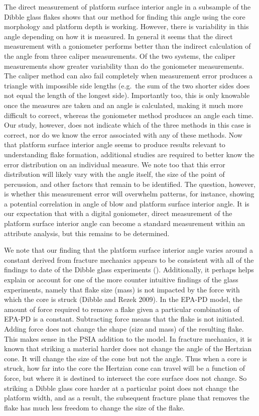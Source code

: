 \documentclass[10pt,letterpaper]{article}
\begin{document}
The direct measurement of platform surface interior angle in a subsample
of the Dibble glass flakes shows that our method for finding this angle
using the core morphology and platform depth is working. However, there
is variability in this angle depending on how it is measured. In general
it seems that the direct measurement with a goniometer performs better
than the indirect calculation of the angle from three caliper
measurements. Of the two systems, the caliper measurements show greater
variability than do the goniometer measurements. The caliper method can
also fail completely when measurement error produces a triangle with
impossible side lengths (e.g.~the sum of the two shorter sides does not
equal the length of the longest side). Importantly too, this is only
knowable once the measures are taken and an angle is calculated, making
it much more difficult to correct, whereas the goniometer method
produces an angle each time. Our study, however, does not indicate which
of the three methods in this case is correct, nor do we know the error
associated with any of these methods. Now that platform surface interior
angle seems to produce results relevant to understanding flake
formation, additional studies are required to better know the error
distribution on an individual measure. We note too that this error
distribution will likely vary with the angle itself, the size of the
point of percussion, and other factors that remain to be identified. The
question, however, is whether this measurement error will overwhelm
patterns, for instance, showing a potential correlation in angle of blow
and platform surface interior angle. It is our expectation that with a
digital goniometer, direct measurement of the platform surface interior
angle can become a standard measurement within an attribute analysis,
but this remains to be determined.

We note that our finding that the platform surface interior angle varies
around a constant derived from fracture mechanics appears to be
consistent with all of the findings to date of the Dibble glass
experiments (). Additionally, it perhaps helps explain or account for
one of the more counter intuitive findings of the glass experiments,
namely that flake size (mass) is not impacted by the force with which
the core is struck (Dibble and Rezek 2009). In the EPA-PD model, the
amount of force required to remove a flake given a particular
combination of EPA-PD is a constant. Subtracting force means that the
flake is not initiated. Adding force does not change the shape (size and
mass) of the resulting flake. This makes sense in the PSIA addition to
the model. In fracture mechanics, it is known that striking a material
harder does not change the angle of the Hertzian cone. It will change
the size of the cone but not the angle. Thus when a core is struck, how
far into the core the Hertzian cone can travel will be a function of
force, but where it is destined to intersect the core surface does not
change. So striking a Dibble glass core harder at a particular point
does not change the platform width, and as a result, the subsequent
fracture plane that removes the flake has much less freedom to change
the size of the flake.
\end{document}
